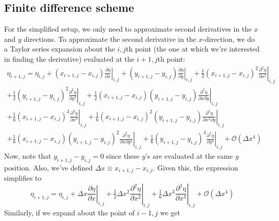 \documentclass[reqno]{article}
\begin{document}
	\subsection{Finite difference scheme}
	For the simplified setup, we only need to approximate second derivatives in the $x$ and $y$ directions. To approximate the second derivative in the $x$-direction, we do a Taylor series expansion about the $i, j$th point (the one at which we're interested in finding the derivative) evaluated at the $i + 1, j$th point:
	\begin{multline}
		\eta_{i + 1, j} = \eta_{i, j} + \left( x_{i + 1, j} - x_{i, j}\right) \left. \frac{\partial \eta}{\partial x}\right|_{i, j} + \left( y_{i + 1, j} - y_{i, j}\right) \left. \frac{\partial \eta}{\partial y}\right|_{i, j} + \tfrac12 \left( x_{i + 1, j} - x_{i, j}\right)^2 \left. \frac{\partial^2 \eta}{\partial x^2}\right|_{i, j}\\
		+ \tfrac12\left( y_{i + 1, j} - y_{i, j}\right)^2 \left. \frac{\partial^2 \eta}{\partial y^2}\right|_{i, j} + \tfrac12 \left(x_{i + 1, j} - x_{i, j}\right)\left( y_{i + 1, j} - y_{i, j}\right) \left. \tfrac{\partial^2 \eta}{\partial x\partial y}\right|_{i, j} \\
		+ \tfrac16 \left( x_{i + 1, j} - x_{i, j} \right)^3 \left.\frac{\partial^3 \eta}{\partial x^3}\right|_{i, j} + \tfrac16 \left(x_{i + 1, j} - x_{i, j}\right)^2 \left( y_{i + 1, j} - y_{i, j} \right) \left. \frac{\partial^3 \eta}{\partial x^2\partial y}\right|_{i, j} \\
		+ \tfrac16 \left( x_{i + 1, j} - x_{i, j}\right) \left( y_{i + 1, j} - y_{i, j} \right)^2 \left.\frac{\partial^3 \eta}{\partial x \partial y^2}\right|_{i, j} + \tfrac16 \left( y_{i + 1, j} - y_{i, j}\right)^3 \left.\frac{\partial^3 \eta}{\partial y^3}\right|_{i, j} + \mathcal{O}\left( \Delta x^4\right)
	\end{multline}
	Now, note that $y_{i + 1, j} - y_{i, j} = 0$ since these $y$'s are evaluated at the same $y$ position. Also, we've defined $\Delta x \equiv x_{i + 1, j} - x_{i, j}$. Given this, the expression simplifies to
	\begin{equation}
		\eta_{i + 1, j} = \eta_{i, j} + \Delta x \left. \frac{\partial \eta}{\partial x}\right|_{i, j} + \tfrac12 \Delta x^2 \left. \frac{\partial^2 \eta}{\partial x^2} \right|_{i, j} + \tfrac16 \Delta x^3 \left.\frac{\partial^3 \eta}{\partial x^3}\right|_{i, j} + \mathcal{O}\left( \Delta x^4 \right)
	\end{equation}
	Similarly, if we expand about the point of $i - 1, j$ we get
\end{document}
